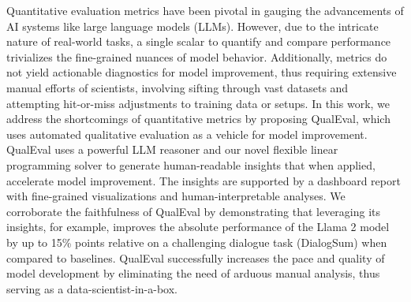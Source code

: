 Quantitative evaluation metrics have been pivotal in gauging the advancements of AI systems like large language models (LLMs). However, due to the intricate nature of real-world tasks, a single scalar to quantify and compare performance trivializes the fine-grained nuances of model behavior. Additionally, metrics do not yield actionable diagnostics for model improvement, thus requiring extensive manual efforts of scientists, involving sifting through vast datasets and attempting hit-or-miss adjustments to training data or setups. In this work, we address the shortcomings of quantitative metrics by proposing QualEval, which uses automated qualitative evaluation as a vehicle for model improvement. QualEval uses a powerful LLM reasoner and our novel flexible linear programming solver to generate human-readable insights that when applied, accelerate model improvement. The insights are supported by a dashboard report with fine-grained visualizations and human-interpretable analyses. We corroborate the faithfulness of QualEval by demonstrating that leveraging its insights, for example, improves the absolute performance of the Llama 2 model by up to 15\% points relative on a challenging dialogue task (DialogSum) when compared to baselines. QualEval successfully increases the pace and quality of model development by eliminating the need of arduous manual analysis, thus serving as a data-scientist-in-a-box.